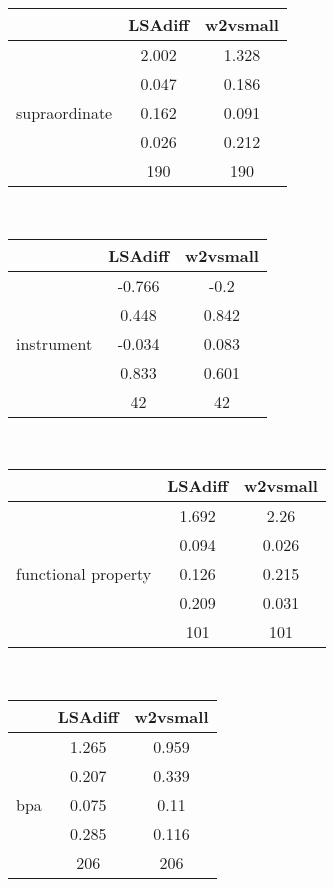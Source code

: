 \documentclass{article}
\begin{document}
\begin{tabular}{ccc|}\cline{2-3}
&\multicolumn{1}{|c}{LSAdiff} & w2vsmall \\\hline
\multicolumn{1}{|c|}{\multirow{5}{*}{supraordinate}} & 2.002 & 1.328 \\
\multicolumn{1}{|c|}{} & 0.047 & 0.186 \\
\multicolumn{1}{|c|}{} & 0.162 & 0.091 \\
\multicolumn{1}{|c|}{} & 0.026 & 0.212 \\
\multicolumn{1}{|c|}{} & 190 & 190 \\
\hline
\end{tabular}\\
\begin{tabular}{ccc|}\cline{2-3}
&\multicolumn{1}{|c}{LSAdiff} & w2vsmall \\\hline
\multicolumn{1}{|c|}{\multirow{5}{*}{instrument}} & -0.766 & -0.2 \\
\multicolumn{1}{|c|}{} & 0.448 & 0.842 \\
\multicolumn{1}{|c|}{} & -0.034 & 0.083 \\
\multicolumn{1}{|c|}{} & 0.833 & 0.601 \\
\multicolumn{1}{|c|}{} & 42 & 42 \\
\hline
\end{tabular}\\
\begin{tabular}{ccc|}\cline{2-3}
&\multicolumn{1}{|c}{LSAdiff} & w2vsmall \\\hline
\multicolumn{1}{|c|}{\multirow{5}{*}{functional property}} & 1.692 & 2.26 \\
\multicolumn{1}{|c|}{} & 0.094 & 0.026 \\
\multicolumn{1}{|c|}{} & 0.126 & 0.215 \\
\multicolumn{1}{|c|}{} & 0.209 & 0.031 \\
\multicolumn{1}{|c|}{} & 101 & 101 \\
\hline
\end{tabular}\\
\begin{tabular}{ccc|}\cline{2-3}
&\multicolumn{1}{|c}{LSAdiff} & w2vsmall \\\hline
\multicolumn{1}{|c|}{\multirow{5}{*}{bpa}} & 1.265 & 0.959 \\
\multicolumn{1}{|c|}{} & 0.207 & 0.339 \\
\multicolumn{1}{|c|}{} & 0.075 & 0.11 \\
\multicolumn{1}{|c|}{} & 0.285 & 0.116 \\
\multicolumn{1}{|c|}{} & 206 & 206 \\
\hline
\end{tabular}\\
\end{document}
